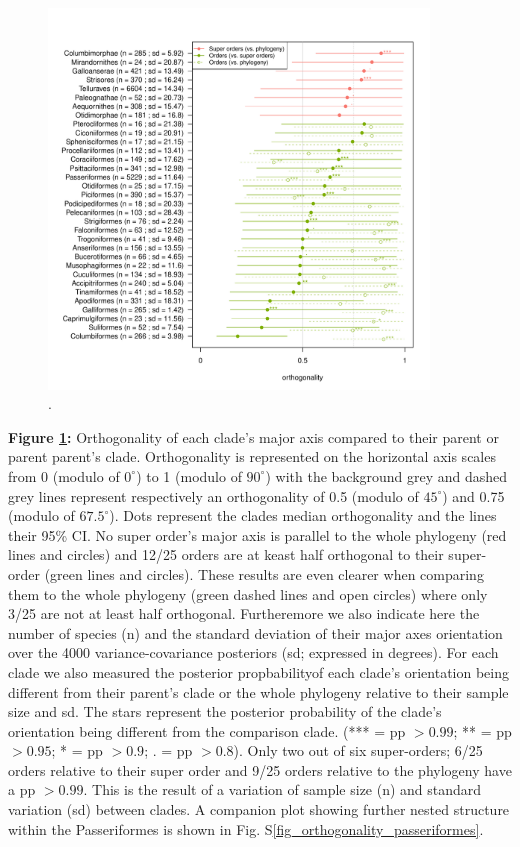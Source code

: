 \documentclass[12pt,letterpaper]{article}
\begin{document}
\bigskip

\begin{figure}[!htbp]
\centering
   \includegraphics[width=0.9\textwidth]{Figures/orthogonality_results.pdf}
\caption{.}
\label{Fig:orthogonality}
\end{figure}

\bigskip

\noindent \textbf{Figure \ref{Fig:orthogonality}:}
Orthogonality of each clade's major axis compared to their parent or parent parent's clade.
Orthogonality is represented on the horizontal axis scales from 0 (modulo of $0^\circ$) to 1 (modulo of $90^\circ$) with the background grey and dashed grey lines represent respectively an orthogonality of 0.5 (modulo of $45^\circ$) and 0.75 (modulo of $67.5^\circ$).
Dots represent the clades median orthogonality and the lines their 95\% CI.
No super order's major axis is parallel to the whole phylogeny (red lines and circles) and 12/25 orders are at keast half orthogonal to their super-order (green lines and circles).
These results are even clearer when comparing them to the whole phylogeny (green dashed lines and open circles) where only 3/25 are not at least half orthogonal.
Furtheremore we also indicate here the number of species (n) and the standard deviation of their major axes orientation over the 4000 variance-covariance posteriors (sd; expressed in degrees).
For each clade we also measured the posterior propbabilityof each clade's orientation being different from their parent's clade or the whole phylogeny relative to their sample size and sd.
The stars represent the posterior probability of the clade's orientation being different from the comparison clade. (*** = pp $> 0.99$; ** = pp $>0.95$; * = pp $> 0.9$; . = pp $> 0.8$).
Only two out of six super-orders; 6/25 orders relative to their super order and 9/25 orders relative to the phylogeny have a pp $> 0.99$.
This is the result of a variation of sample size (n) and standard variation (sd) between clades. 
A companion plot showing further nested structure within the Passeriformes is shown in Fig. S\ref{fig_orthogonality_passeriformes}.
\end{document}
